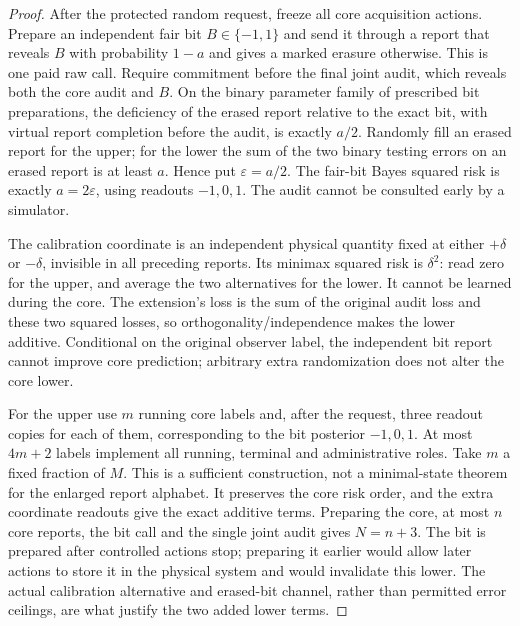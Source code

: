 \begin{proof}
After the protected random request, freeze all core acquisition actions. Prepare an independent fair bit $B\in\{-1,1\}$ and send it through a report that reveals $B$ with probability $1-a$ and gives a marked erasure otherwise. This is one paid raw call. Require commitment before the final joint audit, which reveals both the core audit and $B$. On the binary parameter family of prescribed bit preparations, the deficiency of the erased report relative to the exact bit, with virtual report completion before the audit, is exactly $a/2$. Randomly fill an erased report for the upper; for the lower the sum of the two binary testing errors on an erased report is at least $a$. Hence put $\varepsilon=a/2$. The fair-bit Bayes squared risk is exactly $a=2\varepsilon$, using readouts $-1,0,1$. The audit cannot be consulted early by a simulator.

The calibration coordinate is an independent physical quantity fixed at either $+\delta$ or $-\delta$, invisible in all preceding reports. Its minimax squared risk is $\delta^2$: read zero for the upper, and average the two alternatives for the lower. It cannot be learned during the core. The extension's loss is the sum of the original audit loss and these two squared losses, so orthogonality/independence makes the lower additive. Conditional on the original observer label, the independent bit report cannot improve core prediction; arbitrary extra randomization does not alter the core lower.

For the upper use $m$ running core labels and, after the request, three readout copies for each of them, corresponding to the bit posterior $-1,0,1$. At most $4m+2$ labels implement all running, terminal and administrative roles. Take $m$ a fixed fraction of $M$. This is a sufficient construction, not a minimal-state theorem for the enlarged report alphabet. It preserves the core risk order, and the extra coordinate readouts give the exact additive terms. Preparing the core, at most $n$ core reports, the bit call and the single joint audit gives $N=n+3$. The bit is prepared after controlled actions stop; preparing it earlier would allow later actions to store it in the physical system and would invalidate this lower. The actual calibration alternative and erased-bit channel, rather than permitted error ceilings, are what justify the two added lower terms.
\end{proof}
